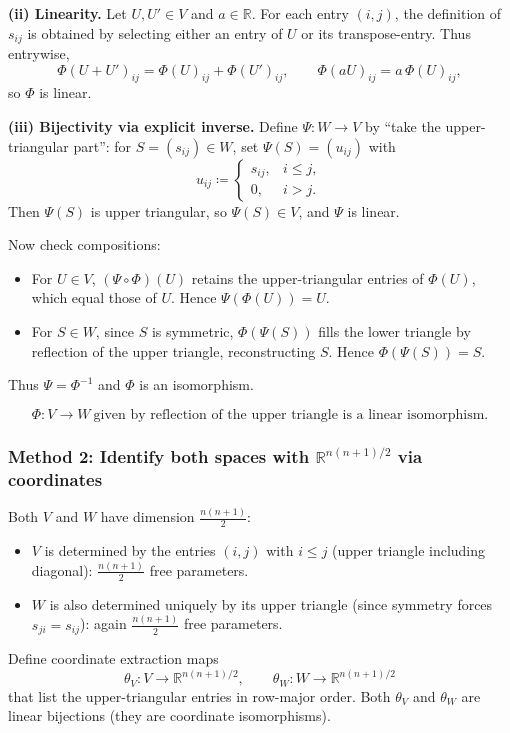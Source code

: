\documentclass[12pt]{article}
\newcommand{\R}{\mathbb{R}}
\begin{document}
\textbf{(ii) Linearity.}
Let $U,U'\in V$ and $a\in\R$. For each entry $(i,j)$, the definition of $s_{ij}$ is obtained by selecting either an entry
of $U$ or its transpose-entry. Thus entrywise,
\[
\Phi(U+U')_{ij}=\Phi(U)_{ij}+\Phi(U')_{ij},\qquad \Phi(aU)_{ij}=a\,\Phi(U)_{ij},
\]
so $\Phi$ is linear.

\textbf{(iii) Bijectivity via explicit inverse.}
Define $\Psi:W\to V$ by ``take the upper-triangular part'':
for $S=(s_{ij})\in W$, set $\Psi(S)=(u_{ij})$ with
\[
u_{ij}\coloneqq
\begin{cases}
s_{ij}, & i\le j,\\
0, & i>j.
\end{cases}
\]
Then $\Psi(S)$ is upper triangular, so $\Psi(S)\in V$, and $\Psi$ is linear.

Now check compositions:
\begin{itemize}[leftmargin=*]
\item For $U\in V$, $(\Psi\circ \Phi)(U)$ retains the upper-triangular entries of $\Phi(U)$, which equal those of $U$.
Hence $\Psi(\Phi(U))=U$.
\item For $S\in W$, since $S$ is symmetric, $\Phi(\Psi(S))$ fills the lower triangle by reflection of the upper triangle,
reconstructing $S$. Hence $\Phi(\Psi(S))=S$.
\end{itemize}
Thus $\Psi=\Phi^{-1}$ and $\Phi$ is an isomorphism.

\[
\boxed{\,\Phi:V\to W\ \text{given by reflection of the upper triangle is a linear isomorphism.}\,}
\]

\subsubsection{Method 2: Identify both spaces with $\R^{n(n+1)/2}$ via coordinates}
Both $V$ and $W$ have dimension $\frac{n(n+1)}{2}$:
\begin{itemize}[leftmargin=*]
\item $V$ is determined by the entries $(i,j)$ with $i\le j$ (upper triangle including diagonal): $\frac{n(n+1)}{2}$ free parameters.
\item $W$ is also determined uniquely by its upper triangle (since symmetry forces $s_{ji}=s_{ij}$): again $\frac{n(n+1)}{2}$ free parameters.
\end{itemize}
Define coordinate extraction maps
\[
\theta_V:V\to \R^{n(n+1)/2},\qquad \theta_W:W\to \R^{n(n+1)/2}
\]
that list the upper-triangular entries in row-major order.
Both $\theta_V$ and $\theta_W$ are linear bijections (they are coordinate isomorphisms).
\end{document}
